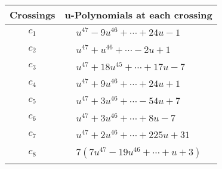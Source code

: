 \documentclass[1p]{elsarticle_modified}
\theoremstyle{definition}
\begin{document}
\begin{tabular}{m{50pt}|m{274pt}}
Crossings & \hspace{64pt}u-Polynomials at each crossing \\
\hline $$\begin{aligned}c_{1}\end{aligned}$$&$\begin{aligned}
&u^{47}-9 u^{46}+\cdots+24 u-1
\end{aligned}$\\
\hline $$\begin{aligned}c_{2}\end{aligned}$$&$\begin{aligned}
&u^{47}+u^{46}+\cdots-2 u+1
\end{aligned}$\\
\hline $$\begin{aligned}c_{3}\end{aligned}$$&$\begin{aligned}
&u^{47}+18 u^{45}+\cdots+17 u-7
\end{aligned}$\\
\hline $$\begin{aligned}c_{4}\end{aligned}$$&$\begin{aligned}
&u^{47}+9 u^{46}+\cdots+24 u+1
\end{aligned}$\\
\hline $$\begin{aligned}c_{5}\end{aligned}$$&$\begin{aligned}
&u^{47}+3 u^{46}+\cdots-54 u+7
\end{aligned}$\\
\hline $$\begin{aligned}c_{6}\end{aligned}$$&$\begin{aligned}
&u^{47}+3 u^{46}+\cdots+8 u-7
\end{aligned}$\\
\hline $$\begin{aligned}c_{7}\end{aligned}$$&$\begin{aligned}
&u^{47}+2 u^{46}+\cdots+225 u+31
\end{aligned}$\\
\hline $$\begin{aligned}c_{8}\end{aligned}$$&$\begin{aligned}
&7(7 u^{47}-19 u^{46}+\cdots+u+3)
\end{aligned}$\\

\end{tabular}
\end{document}
